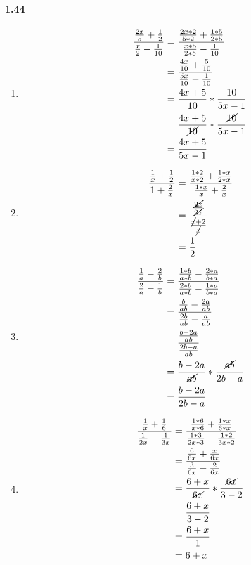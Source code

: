 \documentclass{article}
\newcommand\litem[1]{\item{\bfseries#1\space}}
\begin{document}
\paragraph{1.44}
\begin{enumerate}[label=\emph{\alph*})]
\litem{
  \begin{align*}
    \frac{\frac{2x}{5} + \frac{1}{2}}{\frac{x}{2} - \frac{1}{10}} &= \frac{\frac{2x * 2}{5 * 2} + \frac{1 * 5}{2 * 5}}{\frac{x * 5}{2 * 5} - \frac{1}{10}} \\
    &= \frac{\frac{4x}{10} + \frac{5}{10}}{\frac{5x}{10} - \frac{1}{10}} \\
    &= \frac{4x + 5}{10} * \frac{10}{5x - 1} \\
    &= \frac{4x + 5}{\cancel{10}} * \frac{\cancel{10}}{5x - 1} \\
    &= \frac{4x + 5}{5x -1} 
  \end{align*}
  }
\litem{
\begin{align*}
    \frac{\frac{1}{x} + \frac{1}{2}}{1 + \frac{2}{x}} &= \frac{\frac{1 * 2}{x * 2} + \frac{1 * x}{2 * x}}{\frac{1 * x}{x} + \frac{2}{x}} \\
    &= \frac{\frac{\cancel{2x}}{\cancel{2x}}}{\frac{\cancel{x} + 2}{\cancel{x}}} \\
    &= \frac{1}{2}
\end{align*}
}
\litem{
\begin{align*}
  \frac{\frac{1}{a} - \frac{2}{b}}{\frac{2}{a} - \frac{1}{b}} &= \frac{\frac{1 * b}{a * b} - \frac{2 * a}{b * a}}{\frac{2 * b}{a * b} - \frac{1 * a}{b * a}} \\
  &= \frac{\frac{b}{ab} - \frac{2a}{ab}}{\frac{2b}{ab} - \frac{a}{ab}} \\
  &= \frac{\frac{b - 2a}{ab}}{\frac{2b - a}{ab}} \\
  &= \frac{b - 2a}{\cancel{ab}} * \frac{\cancel{ab}}{2b - a} \\
  &= \frac{b - 2a}{2b - a}
\end{align*}
}
\litem{
\begin{align*}
  \frac{\frac{1}{x} + \frac{1}{6}}{\frac{1}{2x} - \frac{1}{3x}} &= \frac{\frac{1 * 6}{x * 6} + \frac{1 * x}{6 * x}}{\frac{1 * 3}{2x * 3} - \frac{1 * 2}{3x * 2}} \\
  &= \frac{\frac{6}{6x} + \frac{x}{6x}}{\frac{3}{6x} - \frac{2}{6x}} \\
  &= \frac{6 + x}{\cancel{6x}} * \frac{\cancel{6x}}{3 - 2} \\
  &= \frac{6 + x}{3 - 2} \\
  &= \frac{6 + x}{1} \\
  &= 6 + x
\end{align*}
}
\end{enumerate}
\end{document}
